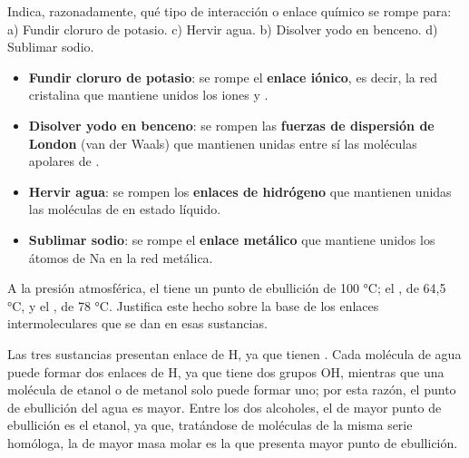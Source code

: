 \begin{exercise}
    Indica, razonadamente, qué tipo de interacción o enlace
    químico se rompe para:
    a) Fundir cloruro de potasio. c) Hervir agua.
    b) Disolver yodo en benceno. d) Sublimar sodio.
    \begin{solu}


        \begin{itemize}
            \item[a)] \textbf{Fundir cloruro de potasio}: se rompe el \textbf{enlace iónico}, es decir, la red cristalina que mantiene unidos los iones  y .
            \item[b)] \textbf{Disolver yodo en benceno}: se rompen las \textbf{fuerzas de dispersión de London} (van der Waals) que mantienen unidas entre sí las moléculas apolares de .
            \item[c)] \textbf{Hervir agua}: se rompen los \textbf{enlaces de hidrógeno} que mantienen unidas las moléculas de  en estado líquido.
            \item[d)] \textbf{Sublimar sodio}: se rompe el \textbf{enlace metálico} que mantiene unidos los átomos de Na en la red metálica.
        \end{itemize}
    \end{solu}
\end{exercise}



\begin{exercise}
    A la presión atmosférica, el  tiene un punto de ebullición
    de 100 °C; el , de 64,5 °C, y el , de
    78 °C. Justifica este hecho sobre la base de los enlaces
    intermoleculares que se dan en esas sustancias.
    \begin{solu}
        Las tres sustancias presentan enlace de H, ya que tienen
        . Cada molécula de agua puede formar dos enlaces de
        H, ya que tiene dos grupos OH, mientras que una molécula
        de etanol o de metanol solo puede formar uno; por esta razón,
        el punto de ebullición del agua es mayor. Entre los dos
        alcoholes, el de mayor punto de ebullición es el etanol, ya
        que, tratándose de moléculas de la misma serie homóloga,
        la de mayor masa molar es la que presenta mayor punto de
        ebullición.
    \end{solu}
\end{exercise}


